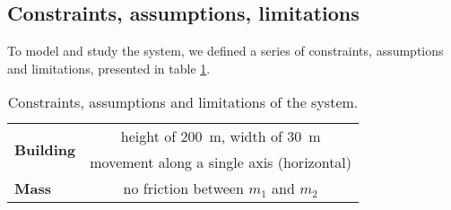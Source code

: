 \subsection{Constraints, assumptions, limitations}
To model and study the system, we defined a series of constraints, assumptions and limitations, presented in table \ref{tab:constraints_assumptions_limitations}.\par
\begin{table}[H]
    \centering
    \begin{tabular}{|l|c|}
        \hline
        \multirow{2}{*}{{\bf Building}} & height of \SI{200}{\meter}, width of \SI{30}{\meter}\\ & movement along a single axis (horizontal)\\\hline
        {\bf Mass} & no friction between $m_1$ and $m_2$\\ \hline
    \end{tabular}
    \caption{Constraints, assumptions and limitations of the system.}
    \label{tab:constraints_assumptions_limitations}
\end{table}
